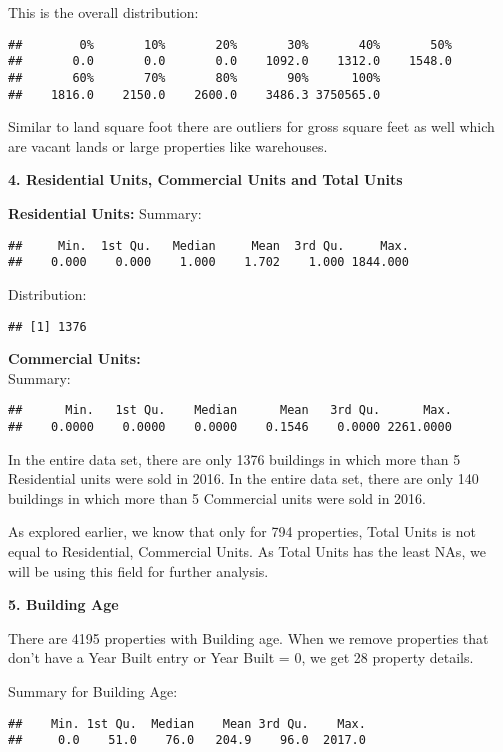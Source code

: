 \documentclass[
  a3paper,
]{article}
\begin{document}
This is the overall distribution:

\begin{verbatim}
##        0%       10%       20%       30%       40%       50% 
##       0.0       0.0       0.0    1092.0    1312.0    1548.0 
##       60%       70%       80%       90%      100% 
##    1816.0    2150.0    2600.0    3486.3 3750565.0
\end{verbatim}

Similar to land square foot there are outliers for gross square feet as
well which are vacant lands or large properties like warehouses.

\textbf{4. Residential Units, Commercial Units and Total Units}

\textbf{Residential Units:} Summary:

\begin{verbatim}
##     Min.  1st Qu.   Median     Mean  3rd Qu.     Max. 
##    0.000    0.000    1.000    1.702    1.000 1844.000
\end{verbatim}

Distribution:

\begin{verbatim}
## [1] 1376
\end{verbatim}

\textbf{Commercial Units:}\\
Summary:

\begin{verbatim}
##      Min.   1st Qu.    Median      Mean   3rd Qu.      Max. 
##    0.0000    0.0000    0.0000    0.1546    0.0000 2261.0000
\end{verbatim}

In the entire data set, there are only 1376 buildings in which more than
5 Residential units were sold in 2016. In the entire data set, there are
only 140 buildings in which more than 5 Commercial units were sold in
2016.

As explored earlier, we know that only for 794 properties, Total Units
is not equal to Residential, Commercial Units. As Total Units has the
least NAs, we will be using this field for further analysis.

\textbf{5. Building Age}

There are 4195 properties with Building age. When we remove properties
that don't have a Year Built entry or Year Built = 0, we get 28 property
details.

Summary for Building Age:

\begin{verbatim}
##    Min. 1st Qu.  Median    Mean 3rd Qu.    Max. 
##     0.0    51.0    76.0   204.9    96.0  2017.0
\end{verbatim}
\end{document}

